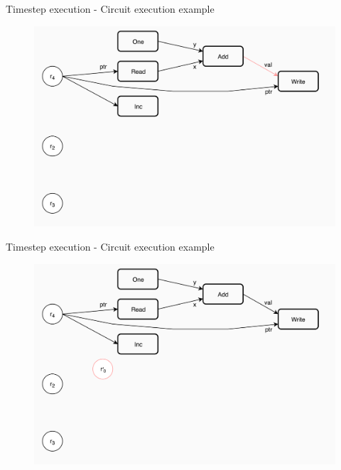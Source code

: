 \documentclass[xcolor={usenames}]{beamer}
\begin{document}
  \begin{frame}{Timestep execution - Circuit execution example}
  	\begin{figure}
  		\centering
  		\includegraphics[width=\textwidth]{../figures/example-circuit-11.png}
  	\end{figure}
  \end{frame}
  \begin{frame}{Timestep execution - Circuit execution example}
  	\begin{figure}
  		\centering
  		\includegraphics[width=\textwidth]{../figures/example-circuit-12.png}
  	\end{figure}
  \end{frame}
\end{document}

